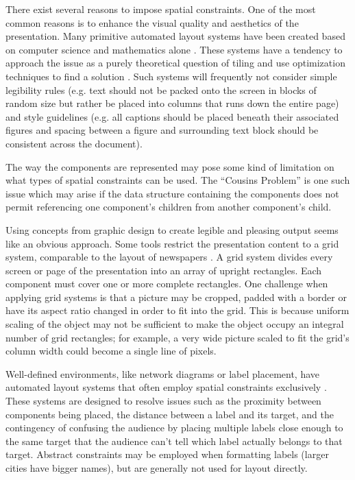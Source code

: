       There exist several reasons to impose spatial constraints. One of the
      most common reasons is to enhance the visual quality and aesthetics of
      the presentation. Many primitive automated layout systems have been
      created based on computer science and mathematics alone \citep{beach-1}.
      These systems have a tendency to approach the issue as a purely
      theoretical question of tiling and use optimization techniques to find a
      solution \citep{luders-1}. Such systems will frequently not consider
      simple legibility rules (e.g. text should not be packed onto the screen
      in blocks of random size but rather be placed into columns that runs down
      the entire page) and style guidelines (e.g. all captions should be
      placed beneath their associated figures and spacing between a figure and
      surrounding text block should be consistent across the document).
     
      The way the components are represented may pose some kind of limitation
      on what types of spatial constraints can be used. The ``Cousins
      Problem'' is one such issue which may arise if the data structure
      containing the components does not permit referencing one component’s
      children from another component’s child.

      Using concepts from graphic design to create legible and pleasing output
      seems like an obvious approach. Some tools restrict the presentation
      content to a grid system, comparable to the layout of newspapers
      \citep{muller-1,hurlburt-1}. A grid system divides every screen or page
      of the presentation into an array of upright rectangles. Each component
      must cover one or more complete rectangles. One challenge when applying
      grid systems is that a picture may be cropped, padded with a border or
      have its aspect ratio changed in order to fit into the grid. This is
      because uniform scaling of the object may not be sufficient to make the
      object occupy an integral number of grid rectangles; for example, a very
      wide picture scaled to fit the grid's column width could become a single
      line of pixels.

      Well-defined environments, like network diagrams or label placement, have
      automated layout systems that often employ spatial constraints
      exclusively \citep{kosak-1,christensen-1}. These systems are designed to
      resolve issues such as the proximity between components being placed, the
      distance between a label and its target, and the contingency of confusing
      the audience by placing multiple labels close enough to the same target
      that the audience can't tell which label actually belongs to that target.
      Abstract constraints may be employed when formatting labels (larger
      cities have bigger names), but are generally not used for layout
      directly.

